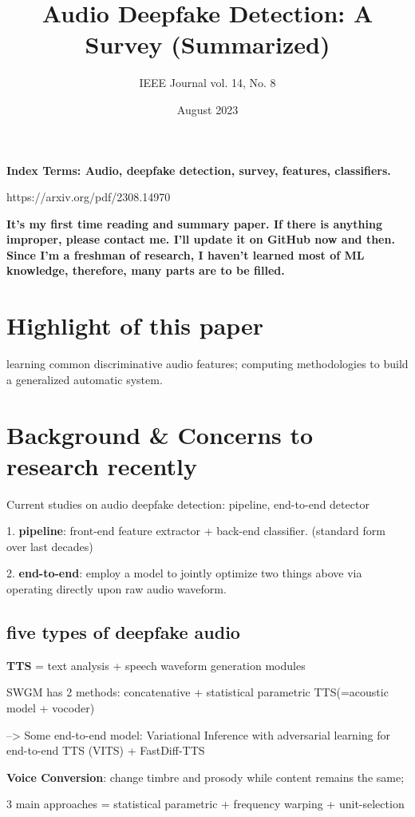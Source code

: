 \documentclass{article}
\title{Audio Deepfake Detection: A Survey (Summarized)}
\author{IEEE Journal vol. 14, No. 8}
\date{August 2023}
\begin{document}
\maketitle
\textbf{Index Terms: Audio, deepfake detection, survey, features, classifiers. }

https://arxiv.org/pdf/2308.14970

\vspace{10pt}
\textbf{It's my first time reading and summary paper. If there is anything improper, please contact me. I'll update it on GitHub now and then. Since I'm a freshman of research, I haven't learned most of ML knowledge, therefore, many parts are to be filled. }


\section{Highlight of this paper}
learning common discriminative audio features; computing methodologies to build a generalized automatic system. 

\section{Background \& Concerns to research recently}

Current studies on audio deepfake detection: pipeline, end-to-end detector

1. \textbf{pipeline}: front-end feature extractor + back-end classifier. (standard form over last decades)

2. \textbf{end-to-end}: employ a model to jointly optimize two things above via operating directly upon raw audio waveform. 

\subsection{five types of deepfake audio}

\textbf{TTS} = text analysis + speech waveform generation modules

SWGM has 2 methods: concatenative + statistical parametric TTS(=acoustic model + vocoder)

--> Some end-to-end model: Variational Inference with adversarial learning for end-to-end TTS (VITS) + FastDiff-TTS

\textbf{Voice Conversion}: change timbre and prosody while content remains the same;

3 main approaches = statistical parametric + frequency warping + unit-selection
\end{document}
